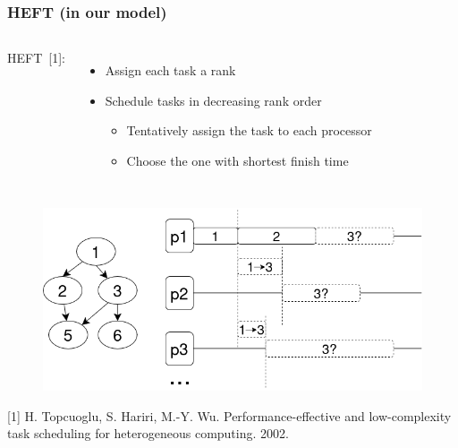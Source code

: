 \documentclass[xcolor=svgnames,titlepage,english,presentation]{beamer}
\begin{document}
\begin{frame}[t]
    \frametitle{HEFT (in our model)}


  \begin{columns}

  HEFT~[1]:

  \begin{itemize}
      \item Assign each task a rank 
      \item Schedule tasks in decreasing rank order
      \begin{itemize}
          \item Tentatively assign the task to each processor
          \item Choose the one with shortest finish time
      \end{itemize}
  \end{itemize}
  

    \end{columns}   

  \begin{figure}
      \centering
        \includegraphics[scale=0.33]{diagrams/images/HEFT.png}
  \end{figure}

\vspace{-0.4cm}
\footnotesize{[1] H. Topcuoglu, S. Hariri, M.-Y. Wu. Performance-effective and
low-complexity task scheduling for heterogeneous computing. 2002.}


 
\end{frame}
\end{document}
